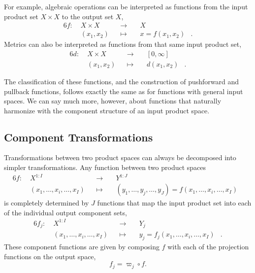 \documentclass[
  letterpaper,
  DIV=11,
  numbers=noendperiod]{scrartcl}
\begin{document}
For example, algebraic operations can be interpreted as functions from
the input product set \(X \times X\) to the output set \(X\),
\begin{alignat*}{6}
f :\; & X \times X & &\rightarrow& \; & X &
\\
& (x_{1}, x_{2}) & &\mapsto& & x = f(x_{1}, x_{2}) &.
\end{alignat*} Metrics can also be interpreted as functions from that
same input product set, \begin{alignat*}{6}
d :\; & X \times X & &\rightarrow& \; & [0, \infty] &
\\
& (x_{1}, x_{2}) & &\mapsto& & d(x_{1}, x_{2}) &.
\end{alignat*}

The classification of these functions, and the construction of
pushforward and pullback functions, follows exactly the same as for
functions with general input spaces. We can say much more, however,
about functions that naturally harmonize with the component structure of
an input product space.

\subsection{Component Transformations}\label{component-transformations}

Transformations between two product spaces can always be decomposed into
simpler transformations. Any function between two product spaces
\begin{alignat*}{6}
f :\; & X^{1:I} & &\rightarrow& \; & Y^{1:J} &
\\
& (x_{1}, \ldots, x_{i}, \ldots, x_{I}) & &\mapsto&
& (y_{1}, \ldots, y_{j}, \ldots, y_{J}) = f(x_{1}, \ldots, x_{i}, \ldots, x_{I}) &
\end{alignat*} is completely determined by \(J\) functions that map the
input product set into each of the individual output component sets,
\begin{alignat*}{6}
f_{j} :\; & X^{1:I} & &\rightarrow& \; & Y_{j} &
\\
& (x_{1}, \ldots, x_{i}, \ldots, x_{I}) & &\mapsto&
& y_{j} = f_{j}(x_{1}, \ldots, x_{i}, \ldots, x_{I}) &.
\end{alignat*} These component functions are given by composing \(f\)
with each of the projection functions on the output space, \[
f_{j} = \varpi_{j} \circ f.
\]
\end{document}
